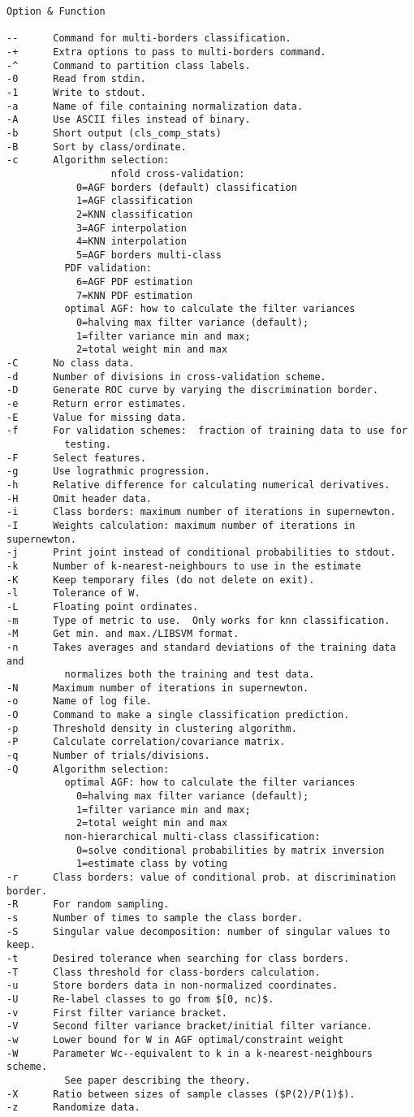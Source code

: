 \documentclass[12pt]{article}
\begin{document}
\begin{verbatim}
Option & Function 

--		Command for multi-borders classification.
-+		Extra options to pass to multi-borders command.
-^		Command to partition class labels.
-0		Read from stdin.
-1		Write to stdout.
-a		Name of file containing normalization data.
-A		Use ASCII files instead of binary.
-b		Short output (cls_comp_stats)
-B		Sort by class/ordinate.
-c		Algorithm selection:
                  nfold cross-validation:
			0=AGF borders (default) classification
			1=AGF classification
			2=KNN classification
			3=AGF interpolation
			4=KNN interpolation
			5=AGF borders multi-class
		  PDF validation:
			6=AGF PDF estimation
			7=KNN PDF estimation
		  optimal AGF: how to calculate the filter variances
			0=halving max filter variance (default);
			1=filter variance min and max;
			2=total weight min and max
-C		No class data.
-d		Number of divisions in cross-validation scheme.
-D		Generate ROC curve by varying the discrimination border.
-e		Return error estimates.
-E		Value for missing data.
-f		For validation schemes:  fraction of training data to use for 
		  testing.
-F		Select features.
-g		Use lograthmic progression.
-h		Relative difference for calculating numerical derivatives. 
-H		Omit header data.
-i		Class borders: maximum number of iterations in supernewton.
-I		Weights calculation: maximum number of iterations in supernewton.
-j		Print joint instead of conditional probabilities to stdout.
-k		Number of k-nearest-neighbours to use in the estimate
-K		Keep temporary files (do not delete on exit).
-l		Tolerance of W.
-L		Floating point ordinates.
-m		Type of metric to use.  Only works for knn classification.
-M		Get min. and max./LIBSVM format.
-n		Takes averages and standard deviations of the training data and 
		  normalizes both the training and test data.
-N		Maximum number of iterations in supernewton.
-o		Name of log file.
-O		Command to make a single classification prediction.
-p		Threshold density in clustering algorithm.
-P		Calculate correlation/covariance matrix.
-q		Number of trials/divisions.
-Q		Algorithm selection:
		  optimal AGF: how to calculate the filter variances
			0=halving max filter variance (default);
			1=filter variance min and max;
			2=total weight min and max
		  non-hierarchical multi-class classification:
			0=solve conditional probabilities by matrix inversion
			1=estimate class by voting
-r		Class borders: value of conditional prob. at discrimination border.
-R		For random sampling.
-s		Number of times to sample the class border.
-S		Singular value decomposition: number of singular values to keep.
-t		Desired tolerance when searching for class borders.
-T		Class threshold for class-borders calculation.
-u		Store borders data in non-normalized coordinates.
-U		Re-label classes to go from $[0, nc)$.
-v		First filter variance bracket.
-V		Second filter variance bracket/initial filter variance.
-w		Lower bound for W in AGF optimal/constraint weight
-W		Parameter Wc--equivalent to k in a k-nearest-neighbours scheme.
		  See paper describing the theory.
-X		Ratio between sizes of sample classes ($P(2)/P(1)$).
-z		Randomize data.
\end{verbatim}
\end{document}
